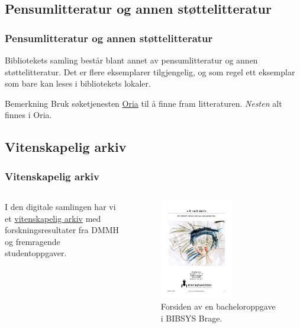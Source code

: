 \documentclass{beamer}
\begin{document}
\subsection{Pensumlitteratur og annen støttelitteratur}
\begin{frame}
  \frametitle{Pensumlitteratur og annen støttelitteratur}
  Bibliotekets samling består blant annet av \alert{pensumlitteratur} og annen \alert{støttelitteratur}. Det er flere eksemplarer tilgjengelig, og som regel ett eksemplar som bare kan leses i bibliotekets lokaler.

  \vfill

  \begin{block}{Bemerkning}
    Bruk søketjenesten \href{http://bibsys-almaprimo.hosted.exlibrisgroup.com/primo_library/libweb/action/search.do?vid=DMMH}{Oria} til å finne fram litteraturen.
    \textit{Nesten} alt finnes i Oria.
  \end{block}
\end{frame}

\subsection{Vitenskapelig arkiv}
\begin{frame}
  \frametitle{Vitenskapelig arkiv}
  \begin{columns}
    I den digitale samlingen har vi et \href{https://brage.bibsys.no/xmlui/handle/11250/92951}{vitenskapelig arkiv} med forskningsresultater fra DMMH og fremragende studentoppgaver.

    \begin{figure}
      \caption{Forsiden av en bacheloroppgave i BIBSYS Brage.}
      \includegraphics[width=0.6\textwidth]{media/front-dahle.png}
    \end{figure}
  \end{columns}
\end{frame}
\end{document}
